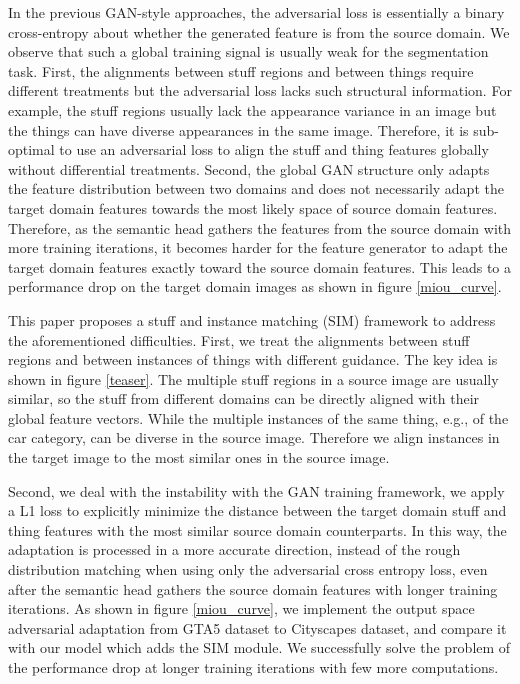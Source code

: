 \documentclass[10pt,twocolumn,letterpaper]{article}
\begin{document}
In the previous GAN-style approaches, the adversarial loss is essentially a binary cross-entropy about whether the generated feature is from the source domain.
We observe that such a global training signal is usually weak for the segmentation task. 
First, the alignments between stuff regions and between things require different treatments but the adversarial loss lacks such structural information.
For example, the stuff regions usually lack the appearance variance in an image but the things can have diverse appearances in the same image. 
Therefore, it is sub-optimal to use an adversarial loss to align the stuff and thing features globally without differential treatments. 
Second, 
the global GAN structure only adapts the feature distribution between two domains and does not necessarily adapt the target domain features towards the most likely space of source domain features. Therefore, as the semantic head gathers the features from the source domain with more training iterations, it becomes harder for the feature generator to adapt the target domain features exactly toward the source domain features. This leads to a performance drop on the target domain images as shown in figure \ref{miou_curve}.  

This paper proposes a stuff and instance matching (SIM) framework to address the aforementioned difficulties. First, we treat the alignments between stuff regions and between instances of things with different guidance. The key idea is shown in figure \ref{teaser}. The multiple stuff regions in a source image are usually similar, so the stuff from different domains can be directly aligned with their global feature vectors. While the multiple instances of the same thing, e.g., of the car category, can be diverse in the source image. Therefore we align instances in the target image to the most similar ones in the source image.

Second, we deal with the instability with the GAN training framework, we apply a L1 loss to explicitly minimize the distance between the target domain stuff and thing features with the most similar source domain counterparts. In this way, the adaptation is processed in a more accurate direction, instead of the rough distribution matching when using only the adversarial cross entropy loss, even after the semantic head gathers the source domain features with longer training iterations. As shown in figure \ref{miou_curve}, we implement the output space adversarial adaptation \cite{outputspace} from GTA5 \cite{gta} dataset to Cityscapes \cite{cityscapes} dataset, and compare it with our model which adds the SIM module. We successfully solve the problem of the performance drop at longer training iterations with few more computations.
\end{document}
